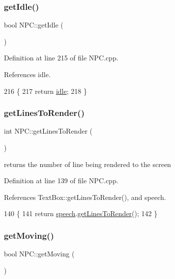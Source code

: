 \subsubsection{\texorpdfstring{get\+Idle()}{getIdle()}}
{\footnotesize\ttfamily bool N\+P\+C\+::get\+Idle (\begin{DoxyParamCaption}{ }\end{DoxyParamCaption})}



Definition at line 215 of file N\+P\+C.\+cpp.



References idle.


\begin{DoxyCode}
216 \{
217     \textcolor{keywordflow}{return} \hyperlink{class_n_p_c_aa228d3e449507a6326cef7b449752e62}{idle};
218 \}
\end{DoxyCode}
\mbox{\label{class_n_p_c_a64425a9a6a4b6262e4f9e0a4e5169ce4}} 
\subsubsection{\texorpdfstring{get\+Lines\+To\+Render()}{getLinesToRender()}}
{\footnotesize\ttfamily int N\+P\+C\+::get\+Lines\+To\+Render (\begin{DoxyParamCaption}{ }\end{DoxyParamCaption})}



returns the number of line being rendered to the screen 



Definition at line 139 of file N\+P\+C.\+cpp.



References Text\+Box\+::get\+Lines\+To\+Render(), and speech.


\begin{DoxyCode}
140 \{
141     \textcolor{keywordflow}{return} \hyperlink{class_n_p_c_a1a1be15df827227f45559388897a9cd5}{speech}.\hyperlink{class_text_box_a7c620113713b6b841ef7e183c1d81312}{getLinesToRender}();
142 \}
\end{DoxyCode}
\mbox{\label{class_n_p_c_acb2a20f35f7bb54569032cc1b6a67be0}} 
\subsubsection{\texorpdfstring{get\+Moving()}{getMoving()}}
{\footnotesize\ttfamily bool N\+P\+C\+::get\+Moving (\begin{DoxyParamCaption}{ }\end{DoxyParamCaption})}



